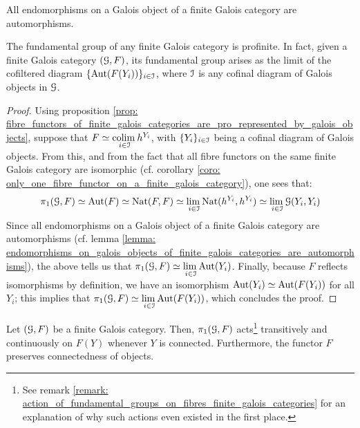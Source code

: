             \begin{lemma} \label{lemma: endomorphisms_on_galois_objects_of_finite_galois_categories_are_automorphisms}
                \cite[pp. 100]{SGA1} All endomorphisms on a Galois object of a finite Galois category are automorphisms.
            \end{lemma}
            \begin{proposition} \label{prop: fundamental_groups_of_finite_galois_categories_are_profinite}
                The fundamental group of any finite Galois category is profinite. In fact, given a finite Galois category $(\mathcal{G}, F)$, its fundamental group arises as the limit of the cofiltered diagram $\{\mathrm{Aut}(F(Y_i))\}_{i \in \mathcal{I}}$, where $\mathcal{I}$ is any cofinal diagram of Galois objects in $\mathcal{G}$.
            \end{proposition}
                \begin{proof}
                    Using proposition \ref{prop: fibre_functors_of_finite_galois_categories_are_pro_represented_by_galois_objects}, suppose that $F \simeq \underset{i \in \mathcal{I}}{\operatorname{colim} \:} h^{Y_i}$, with $\{Y_i\}_{i \in \mathcal{I}}$ being a cofinal diagram of Galois objects. From this, and from the fact that all fibre functors on the same finite Galois category are isomorphic (cf. corollary \ref{coro: only_one_fibre_functor_on_a_finite_galois_category}), one sees that:
                        $$\pi_1(\mathcal{G}, F) \simeq \mathrm{Aut}(F) \simeq \mathrm{Nat}(F, F) \simeq \underset{i \in \mathcal{I}}{\operatorname{lim} \:} \mathrm{Nat}(h^{Y_i}, h^{Y_i}) \simeq \underset{i \in \mathcal{I}}{\operatorname{lim} \:} \mathcal{G}(Y_i, Y_i)$$
                    Since all endomorphisms on a Galois object of a finite Galois category are automorphisms (cf. lemma \ref{lemma: endomorphisms_on_galois_objects_of_finite_galois_categories_are_automorphisms}), the above tells us that $\pi_1(\mathcal{G}, F) \simeq \underset{i \in \mathcal{I}}{\operatorname{lim} \:} \mathrm{Aut}(Y_i)$. Finally, because $F$ reflects isomorphisms by definition, we have an isomorphism $\mathrm{Aut}(Y_i) \simeq \mathrm{Aut}(F(Y_i))$ for all $Y_i$; this implies that $\pi_1(\mathcal{G}, F) \simeq \underset{i \in \mathcal{I}}{\operatorname{lim} \:} \mathrm{Aut}(F(Y_i))$, which concludes the proof.
                \end{proof}
            \begin{corollary} \label{coro: fundamental_groups_of_finite_galois_categories_act_transitively_on_connected_objects}
                Let $(\mathcal{G}, F)$ be a finite Galois category. Then, $\pi_1(\mathcal{G}, F)$ acts\footnote{See remark \ref{remark: action_of_fundamental_groups_on_fibres_finite_galois_categories} for an explanation of why such actions even existed in the first place.} transitively and continuously on $F(Y)$ whenever $Y$ is connected. Furthermore, the functor $F$ preserves connectedness of objects. 
            \end{corollary}
            
